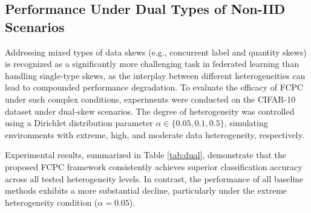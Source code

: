 \documentclass[journal,twoside,web]{ieeecolor}
\begin{document}
\subsection{Performance Under Dual Types of Non-IID Scenarios}



Addressing mixed types of data skews (e.g., concurrent label and quantity skews) is recognized as a significantly more challenging task in federated learning than handling single-type skews, as the interplay between different heterogeneities can lead to compounded performance degradation. To evaluate the efficacy of FCPC under such complex conditions, experiments were conducted on the CIFAR-10 dataset under dual-skew scenarios. The degree of heterogeneity was controlled using a Dirichlet distribution parameter $\alpha \in \{0.05, 0.1, 0.5\}$, simulating environments with extreme, high, and moderate data heterogeneity, respectively.

Experimental results, summarized in Table \ref{tab:dual}, demonstrate that the proposed FCPC framework consistently achieves superior classification accuracy across all tested heterogeneity levels. In contrast, the performance of all baseline methods exhibits a more substantial decline, particularly under the extreme heterogeneity condition ($\alpha=0.05$).
\end{document}
